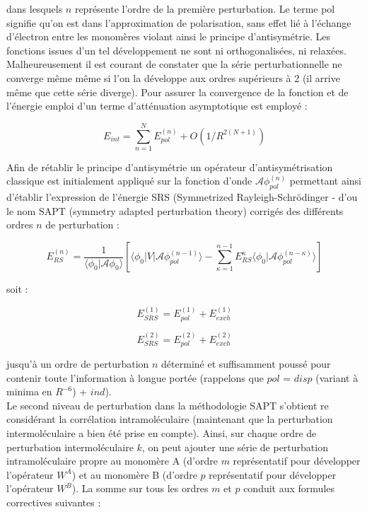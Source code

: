 	dans lesquels $n$ représente l’ordre de la première perturbation. Le terme \og pol \fg{} signifie qu’on est dans l'approximation de polarisation, sans effet lié à l’échange d’électron entre les monomères violant ainsi le principe d’antisymétrie. Les fonctions issues d’un tel développement ne sont ni orthogonalisées, ni relaxées.\\
	
	Malheureusement il est courant de constater que la série perturbationnelle ne converge même même si l’on la développe aux ordres supérieurs à 2 (il arrive même que cette série diverge). Pour assurer la convergence de la fonction et de l’énergie emploi d’un terme d’atténuation asymptotique est employé : 
	
	\begin{equation}
	E_{int} = \sum_{n=1}^{N} E_{pol}^{(n)} + O(1/R^{2 (N+1)})
	\end{equation}
	
	Afin de rétablir le principe d’antisymétrie un opérateur d’antisymétrisation classique est initialement appliqué sur la fonction d’onde $\mathscr{A} \phi_{pol}^{(n)}$ permettant ainsi d’établir l’expression de l’énergie SRS (Symmetrized Rayleigh-Schr\"{o}dinger - d’ou le nom SAPT (symmetry adapted perturbation theory) corrigés des différents ordres $n$ de perturbation :
	
	\begin{equation}
	E_{RS}^{(n)} = \frac{1}{\langle\phi_{0}|\mathscr{A}\phi_{0}\rangle} \left[\langle\phi_{0} | V| \mathscr{A} \phi_{pol}^{(n-1)}\rangle - \sum_{\kappa=1}^{n-1} E_{RS}^{\kappa} \langle \phi_{0}|\mathscr{A} \phi_{pol}^{(n-\kappa)}\rangle\right]
	\end{equation}
	
	soit :
	
	\begin{equation}
	E_{SRS}^{(1)} = E_{pol}^{(1)} + E_{exch}^{(1)}
	\end{equation}
	
	\begin{equation}
	E_{SRS}^{(2)} = E_{pol}^{(2)} + E_{exch}^{(2)}
	\end{equation}
	
	jusqu’à un ordre de perturbation $n$ déterminé et suffisamment poussé pour contenir toute l’information à longue portée (rappelons que $pol$ = $disp$ (variant à minima en $R^{-6}$) + $ind$).\\
	
	
	Le second niveau de perturbation dans la méthodologie SAPT s’obtient re considérant la corrélation intramoléculaire (maintenant que la perturbation intermoléculaire a bien été prise en compte). Ainsi, sur chaque ordre de perturbation intermoléculaire $k$, on peut ajouter une série de perturbation intramoléculaire propre au monomère A (d’ordre $m$ représentatif pour développer l’opérateur $W^{A}$) et au monomère B (d’ordre $p$ représentatif pour développer l’opérateur $W^{B}$). La somme sur tous les ordres $m$ et $p$ conduit aux formules correctives suivantes :
	
